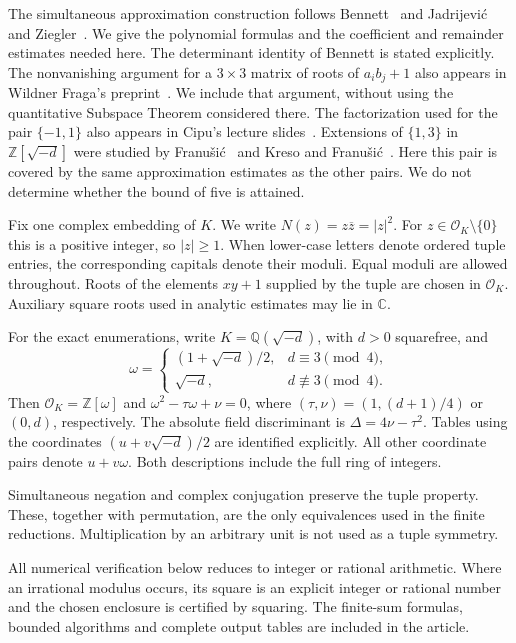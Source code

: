 \documentclass[12pt]{article}
\numberwithin{equation}{section}
\begin{document}
The simultaneous approximation construction follows Bennett~\cite{Bennett96}
and Jadrijevi\'c and Ziegler~\cite{JZ}. We give the polynomial formulas and
the coefficient and remainder estimates needed here. The determinant
identity of Bennett is stated explicitly. The nonvanishing argument for
a $3\times3$ matrix of roots of $a_i b_j+1$ also appears in
Wildner Fraga's preprint~\cite{W}. We include that argument, without using
the quantitative Subspace Theorem considered there. The factorization
used for the pair $\{-1,1\}$ also appears in Cipu's lecture
slides~\cite{Cipu25}. Extensions of $\{1,3\}$ in
$\mathbb Z[\sqrt{-d}]$ were studied by Franu\v{s}i\'c~\cite{F10} and
Kreso and Franu\v{s}i\'c~\cite{FK11}. Here this pair is covered by the
same approximation estimates as the other pairs. We do not determine
whether the bound of five is attained.

Fix one complex embedding of $K$. We write $N(z)=z\overline z=|z|^2$.
For $z\in\mathcal O_K\setminus\{0\}$ this is a positive integer, so
$|z|\ge1$. When lower-case letters denote ordered tuple entries,
the corresponding capitals denote their moduli. Equal moduli are allowed throughout. Roots of the elements $xy+1$
supplied by the tuple are chosen in $\mathcal O_K$. Auxiliary square
roots used in analytic estimates may lie in $\mathbb C$.

For the exact enumerations, write $K=\mathbb Q(\sqrt{-d})$, with
$d>0$ squarefree, and
\[
 \omega=\begin{cases}(1+\sqrt{-d})/2,&d\equiv3\pmod4,\\
                     \sqrt{-d},&d\not\equiv3\pmod4.
       \end{cases}
\]
Then $\mathcal O_K=\mathbb Z[\omega]$ and
$\omega^2-\tau\omega+\nu=0$, where
$(\tau,\nu)=(1,(d+1)/4)$ or $(0,d)$, respectively.
The absolute field discriminant is $\Delta=4\nu-\tau^2$.
Tables using the coordinates $(u+v\sqrt{-d})/2$ are identified explicitly.
All other coordinate pairs denote $u+v\omega$. Both descriptions include
the full ring of integers.

Simultaneous negation and complex conjugation preserve the tuple
property. These, together with permutation, are the only equivalences
used in the finite reductions. Multiplication by an arbitrary unit
is not used as a tuple symmetry.

All numerical verification below reduces to integer or rational
arithmetic. Where an irrational modulus occurs, its square is an
explicit integer or rational number and the chosen enclosure is
certified by squaring. The finite-sum formulas, bounded algorithms and complete output tables
are included in the article.
\end{document}

